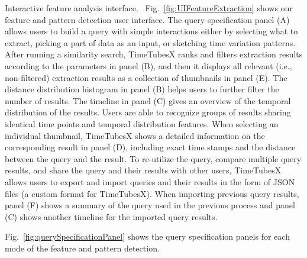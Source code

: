 \textsf{Interactive feature analysis interface.\ } 
Fig.~\ref{fig:UIFeatureExtraction} shows our feature and pattern detection user interface. 
The query specification panel (A) allows users %
to build a query with simple interactions either by selecting what to extract, picking a part of data as an input, or sketching time variation patterns.
After running a similarity search, 
TimeTubesX ranks and filters extraction results according to the parameters in panel (B),
and then it displays all relevant (i.e., non-filtered) extraction results as a collection of thumbnails in panel (E).
The distance distribution histogram in panel (B) helps users to further filter the number of results.
The timeline in panel (C) gives an overview of the temporal distribution of the results.
Users are able to recognize groups of results sharing identical time points and temporal distribution features.
When selecting an individual thumbnail, TimeTubesX shows a detailed information on the corresponding result in panel (D), including exact time stamps and the distance between the query and the result.
To re-utilize the query, compare multiple query results, and share the query and their results with other users, 
TimeTubesX allows users to export and import queries and their results in the form of JSON files (a custom format for TimeTubesX).
When importing previous query results,
panel (F) shows a summary of the query used in the previous process and panel (C) shows another timeline for the imported query results.

Fig.~\ref{fig:querySpecificationPanel} shows the query specification panels for each mode of the feature and pattern detection.

